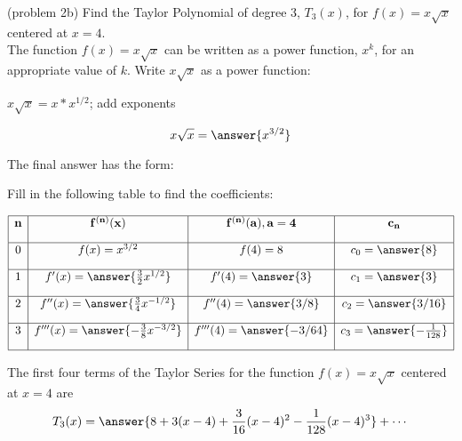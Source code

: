 \documentclass[handout]{ximera}
\begin{document}
\begin{problem}(problem 2b) Find the Taylor Polynomial of degree 3, $T_3(x)$, for
 $f(x) = x\sqrt x$ centered at $x = 4$.\\

The function $f(x) = x\sqrt x$ can be written as a power function, $x^k$, for an appropriate value of $k$.
Write $x\sqrt x$ as a power function:
\begin{hint}
$x\sqrt x = x*x^{1/2}$; add exponents
\end{hint}
\[
x\sqrt x = \answer{x^{3/2}}
\]


The final answer has the form:
\begin{center}
\begin{multipleChoice}
\end{multipleChoice}
\end{center}

Fill in the following table to find the coefficients:

\[
\begin{array}{|c|c|c|c|} 
\hline
\bf{n} & \bf{f^{(n)}(x)} & \bf{f^{(n)}(a), a = 4} & \bf{c_n} \\[1em] 
\hline
 0 & f(x) = x^{3/2} & f(4) = 8 & c_0 = \answer{8} \\[1em]
\hline
1 & f'(x) = \answer{\frac32 x^{1/2}} & f'(4) = \answer{3} & c_1 = \answer{3} \\[1em]
\hline
 2 & f''(x) =\answer{\frac34 x^{-1/2}} & f''(4) = \answer{3/8} & c_2 = \answer{3/16} \\[1em]
\hline
 3 & f'''(x) =\answer{-\frac38 x^{-3/2}} & f'''(4) = \answer{-3/64} & c_3 = \answer{-\frac{1}{128}}\\[1em]
\hline
\end{array}
\]


The first four terms of the Taylor Series for the function $f(x) = x\sqrt x$ centered at $x = 4$ are
\[
T_3(x) = \answer{8 + 3(x-4) +\frac{3}{16}(x-4)^2 - \frac{1}{128}(x-4)^3} + \cdots
\]


\end{problem}
\end{document}
